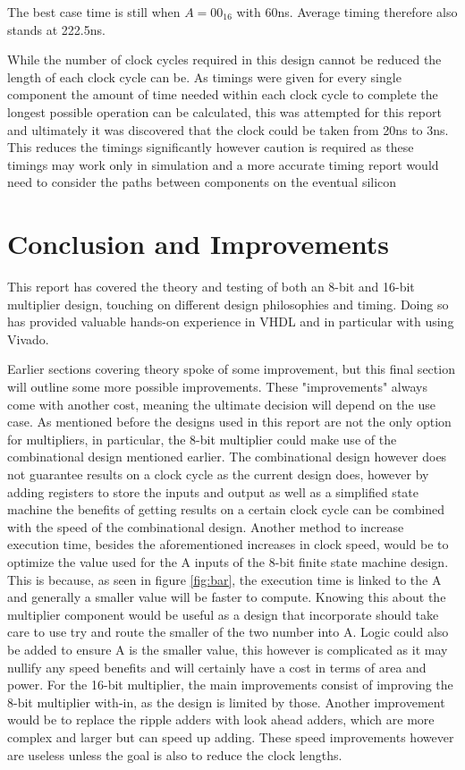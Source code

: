 \documentclass[11pt]{article}
\begin{document}
The best case time is still when $A=00_{16}$ with 60ns.
Average timing therefore also stands at 222.5ns.

While the number of clock cycles required in this design cannot be reduced the length of each clock cycle can be.
As timings were given for every single component the amount of time needed within each clock cycle to complete the longest possible operation can be calculated,
this was attempted for this report and ultimately it was discovered that the clock could be taken from 20ns to 3ns.
This reduces the timings significantly however caution is required as these timings may work only in simulation and a more accurate timing report would need to consider the paths between components on the eventual silicon

\section{Conclusion and Improvements}
This report has covered the theory and testing of both an 8-bit and 16-bit multiplier design,
touching on different design philosophies and timing. 
Doing so has provided valuable hands-on experience in VHDL and in particular with using Vivado.

Earlier sections covering theory spoke of some improvement, but this final section will outline some more possible improvements.
These "improvements" always come with another cost, meaning the ultimate decision will depend on the use case.
As mentioned before the designs used in this report are not the only option for multipliers, in particular, the 8-bit multiplier could make use of the combinational design mentioned earlier.
The combinational design however does not guarantee results on a clock cycle as the current design does,
however by adding registers to store the inputs and output as well as a simplified state machine the benefits of getting results on a certain clock cycle can be combined with the speed of the combinational design.
Another method to increase execution time, besides the aforementioned increases in clock speed, would be to optimize the value used for the A inputs of the 8-bit finite state machine design.
This is because, as seen in figure \ref{fig:bar}, the execution time is linked to the A and generally a smaller value will be faster to compute. 
Knowing this about the multiplier component would be useful as a design that incorporate should take care to use try and route the smaller of the two number into A.
Logic could also be added to ensure A is the smaller value, this however is complicated as it may nullify any speed benefits and will certainly have a cost in terms of area and power. 
For the 16-bit multiplier, the main improvements consist of improving the 8-bit multiplier with-in, as the design is limited by those.
Another improvement would be to replace the ripple adders with look ahead adders, which are more complex and larger but can speed up adding.
These speed improvements however are useless unless the goal is also to reduce the clock lengths.
\end{document}
